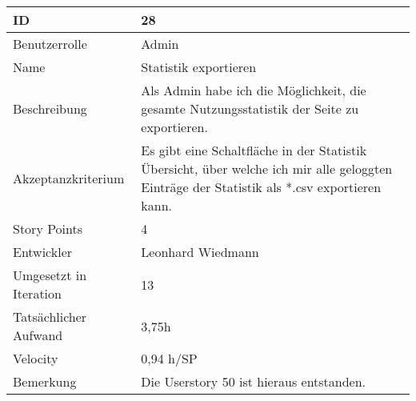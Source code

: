 \begin{tabularx}{\textwidth}{|p{}|X|}
	\hline
	ID & 28 \\
	\hline
	Benutzerrolle & Admin \\
	\hline
	Name & Statistik exportieren\\
	\hline
	Beschreibung & Als Admin habe ich die Möglichkeit, die gesamte Nutzungsstatistik der Seite zu exportieren. \\
	\hline
	Akzeptanzkriterium & Es gibt eine Schaltfläche in der Statistik Übersicht, über welche ich mir alle geloggten Einträge der Statistik als *.csv exportieren kann. \\
	\hline
	Story Points & 4 \\
	\hline
	Entwickler & Leonhard Wiedmann \\
	\hline
	Umgesetzt in Iteration & 13 \\
	\hline
	Tatsächlicher Aufwand & 3,75h \\
	\hline
	Velocity & 0,94 h/SP\\
	\hline
	Bemerkung & Die Userstory 50 ist hieraus entstanden.\\
	\hline
\end{tabularx}
\vspace{20pt}
